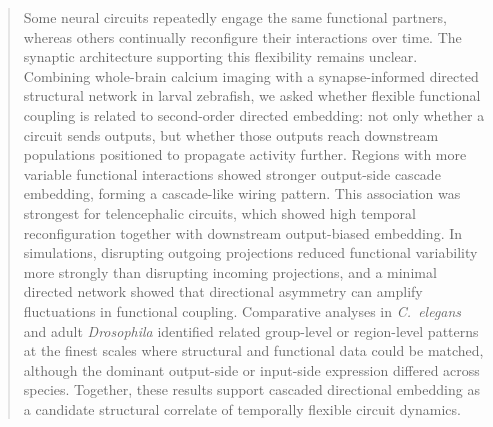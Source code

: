 \documentclass[9pt,twocolumn,twoside]{pnas-new}
\begin{document}

\begin{abstract}
Some neural circuits repeatedly engage the same functional partners, whereas others continually reconfigure their interactions over time.
The synaptic architecture supporting this flexibility remains unclear.
Combining whole-brain calcium imaging with a synapse-informed directed structural network in larval zebrafish, we asked whether flexible functional coupling is related to second-order directed embedding: not only whether a circuit sends outputs, but whether those outputs reach downstream populations positioned to propagate activity further.
Regions with more variable functional interactions showed stronger output-side cascade embedding, forming a cascade-like wiring pattern.
This association was strongest for telencephalic circuits, which showed high temporal reconfiguration together with downstream output-biased embedding.
In simulations, disrupting outgoing projections reduced functional variability more strongly than disrupting incoming projections, and a minimal directed network showed that directional asymmetry can amplify fluctuations in functional coupling.
Comparative analyses in \textit{C.~elegans} and adult \textit{Drosophila} identified related group-level or region-level patterns at the finest scales where structural and functional data could be matched, although the dominant output-side or input-side expression differed across species.
Together, these results support cascaded directional embedding as a candidate structural correlate of temporally flexible circuit dynamics.
\end{abstract}





\maketitle
\thispagestyle{firststyle}

\Firstpage

\end{document}
